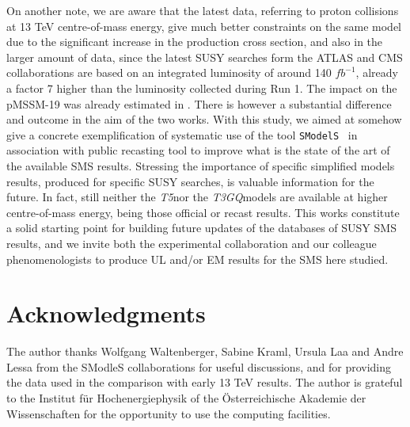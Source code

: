 \documentclass[a4paper,11pt]{article}
\newcommand{\SMO}{\texttt{SModelS\xspace}}
\newcommand{\TGQ}{ \textit{T3GQ}}
\newcommand{\Tfive}{ \textit{T5}}
\begin{document}
On another note, we are aware that the latest data, referring to proton collisions at 13 TeV centre-of-mass energy, give much better constraints on the same model due to the significant increase in the production cross section, and also in the larger amount of data, since the latest SUSY searches form the ATLAS and CMS collaborations are based on an integrated luminosity of around 140 $fb^{-1}$, already a factor 7 higher than the luminosity collected during Run 1. The impact on the pMSSM-19 was already estimated in \cite{Dutta:2018ioj}. There is however a substantial difference and outcome in the aim of the two works. With this study, we aimed at somehow give a concrete exemplification of systematic use of the tool \SMO~ in association with public recasting tool to improve what is the state of the art of the available SMS results. Stressing the importance of specific simplified models results, produced for specific SUSY searches, is valuable information for the future. In fact, still neither the \Tfive nor the \TGQ models are available at higher centre-of-mass energy, being those official or recast results. This works constitute a solid starting point for building future updates of the databases of SUSY SMS results, and we invite both the experimental collaboration and our colleague phenomenologists to produce UL and/or EM results for the SMS here studied.
%
\section*{Acknowledgments}
The author thanks Wolfgang Waltenberger, Sabine Kraml, Ursula Laa and Andre Lessa from the SModleS collaborations for useful discussions, and for providing the data used in the comparison with early 13 TeV results. The author is grateful to the Institut f\"ur Hochenergiephysik of the \"Osterreichische Akademie der Wissenschaften for the opportunity to use the computing facilities.
%


\clearpage
\appendix
%
\end{document}
